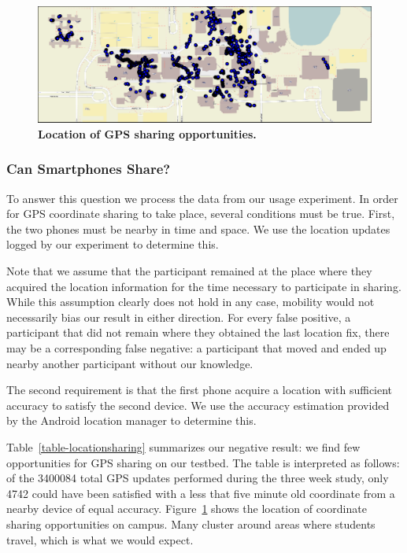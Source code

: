 \begin{figure}[t]
\includegraphics[width=\textwidth]{./figures/location/loc_sharing/map_gps_all.pdf}
\caption{\textbf{Location of GPS sharing opportunities.}}
\label{fig-locationsharing}
\end{figure}

\subsubsection{Can Smartphones Share?}

To answer this question we process the data from our usage experiment. In
order for GPS coordinate sharing to take place, several conditions must be
true. First, the two phones must be nearby in time and space. We use the
location updates logged by our experiment to determine this.

Note that we assume that the participant remained at the place where they
acquired the location information for the time necessary to participate in
sharing. While this assumption clearly does not hold in any case, mobility
would not necessarily bias our result in either direction. For every false
positive, a participant that did not remain where they obtained the last
location fix, there may be a corresponding false negative: a participant that
moved and ended up nearby another participant without our knowledge.

The second requirement is that the first phone acquire a location with
sufficient accuracy to satisfy the second device. We use the accuracy
estimation provided by the Android location manager to determine this.

Table~\ref{table-locationsharing} summarizes our negative result: we find few
opportunities for GPS sharing on our testbed. The table is interpreted as
follows: of the \num{3400084} total GPS updates performed during the three
week study, only \num{4742} could have been satisfied with a less that five
minute old coordinate from a nearby device of equal accuracy.
Figure~\ref{fig-locationsharing} shows the location of coordinate sharing
opportunities on campus. Many cluster around areas where students travel,
which is what we would expect.

